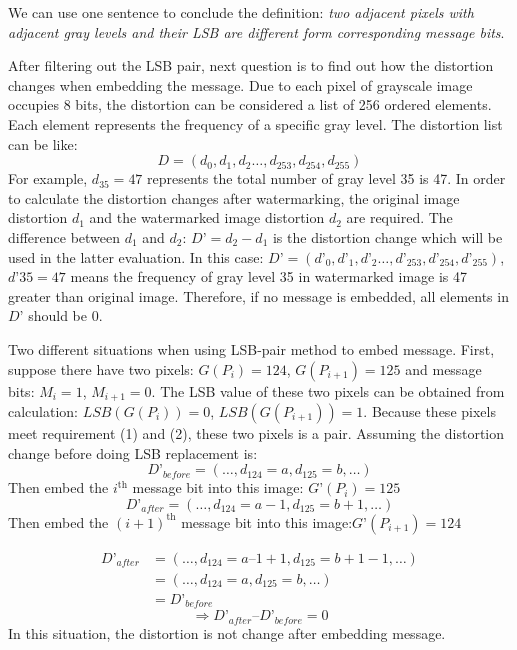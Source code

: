 \documentclass[%
    reprint,
    amsmath,amssymb,
    aps,
   ]{revtex4-1}
\begin{document}
   We can use one sentence to conclude the definition: \textit{two adjacent pixels with adjacent gray levels and their LSB are different form corresponding message bits}.
   
   After filtering out the LSB pair, next question is to find out how the distortion changes when embedding the message. Due to each pixel of grayscale image occupies 8 bits, the distortion can be considered a list of 256 ordered elements. Each element represents the frequency of a specific gray level. The distortion list can be like:
   \[D = (d_{0}, d_{1}, d_{2} … , d_{253}, d_{254}, d_{255})\]
   For example, \(d_{35} = 47\) represents the total number of gray level 35 is 47. In order to calculate the distortion changes after watermarking, the original image distortion \(d_{1}\) and the watermarked image distortion \(d_{2}\) are required. The difference between \(d_{1}\) and \(d_{2}\): \(D’ = d_{2} - d_{1}\) is the distortion change which will be used in the latter evaluation. In this case: \(D’ = (d’_{0}, d’_{1}, d’_{2}…, d’_{253}, d’_{254}, d’_{255})\), \(d’35 = 47\) means the frequency of gray level 35 in watermarked image is 47 greater than original image. Therefore, if no message is embedded, all elements in \(D’\) should be 0.
   
   
   Two different situations when using LSB-pair method to embed message. First, suppose there have two pixels: \(G(P_{i}) = 124\), \(G(P_{i+1}) = 125\) and message bits: \(M_{i} = 1\), \(M_{i+1} = 0\). The LSB value of these two pixels can be obtained from calculation: \(LSB(G(P_{i})) = 0\), \(LSB(G(P_{i+1})) = 1\). Because these pixels meet requirement (1) and (2), these two pixels is a pair. Assuming the distortion change before doing LSB replacement is:
   \[D’_{before} = (…, d_{124} = a, d_{125} = b, …)\]
   Then embed the $i^{\text{th}}$ message bit into this image: \(G’(P_{i}) = 125\)
   \[D’_{after} = (…, d_{124} = a - 1, d_{125} = b + 1, …)\]
   Then embed the $(i+1)^{\text{th}}$ message bit into this image:\(G’(P_{i+1}) = 124\)
   
   \begin{align*} 
   D’_{after}  &= (…, d_{124} = a – 1 + 1, d_{125} = b + 1 - 1, …)\\
               &= (…, d_{124} = a, d_{125} = b, …)\\
               &= D’_{before}
   \end{align*}
   \[ \Rightarrow D’_{after} – D’_{before} = 0\]
   In this situation, the distortion is not change after embedding message.
   
\end{document}
